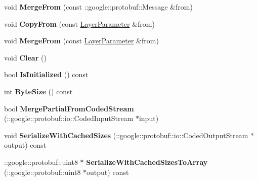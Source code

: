 \begin{DoxyCompactItemize}
void {\bfseries Merge\+From} (const \+::google\+::protobuf\+::\+Message \&from)
\item 
\mbox{\label{classcaffe_1_1_layer_parameter_a29d39d936896d253d3fd2b09ec1e53de}} 
void {\bfseries Copy\+From} (const \mbox{\hyperlink{classcaffe_1_1_layer_parameter}{Layer\+Parameter}} \&from)
\item 
\mbox{\label{classcaffe_1_1_layer_parameter_a726b2ba48f5e6e3d905038cf6ec970b6}} 
void {\bfseries Merge\+From} (const \mbox{\hyperlink{classcaffe_1_1_layer_parameter}{Layer\+Parameter}} \&from)
\item 
\mbox{\label{classcaffe_1_1_layer_parameter_a4d0ae6ff99b4dcc75a48344485c090b7}} 
void {\bfseries Clear} ()
\item 
\mbox{\label{classcaffe_1_1_layer_parameter_a2cf5f2ae6c6a0bec637ec5f9fdb18226}} 
bool {\bfseries Is\+Initialized} () const
\item 
\mbox{\label{classcaffe_1_1_layer_parameter_af5a3a50d881fce35e99cbdb6e8cb734d}} 
int {\bfseries Byte\+Size} () const
\item 
\mbox{\label{classcaffe_1_1_layer_parameter_a2e06af70b44accbb5483b213def6987c}} 
bool {\bfseries Merge\+Partial\+From\+Coded\+Stream} (\+::google\+::protobuf\+::io\+::\+Coded\+Input\+Stream $\ast$input)
\item 
\mbox{\label{classcaffe_1_1_layer_parameter_a549c8a6d44952cb4fe77db8a2192e8fa}} 
void {\bfseries Serialize\+With\+Cached\+Sizes} (\+::google\+::protobuf\+::io\+::\+Coded\+Output\+Stream $\ast$output) const
\item 
\mbox{\label{classcaffe_1_1_layer_parameter_aebaedb566cd19aba3de28db8df92023c}} 
\+::google\+::protobuf\+::uint8 $\ast$ {\bfseries Serialize\+With\+Cached\+Sizes\+To\+Array} (\+::google\+::protobuf\+::uint8 $\ast$output) const
\item 
\mbox{\label{classcaffe_1_1_layer_parameter_aa68dc098f50d9798f6c48c7582347df2}} 

\end{DoxyCompactItemize}
